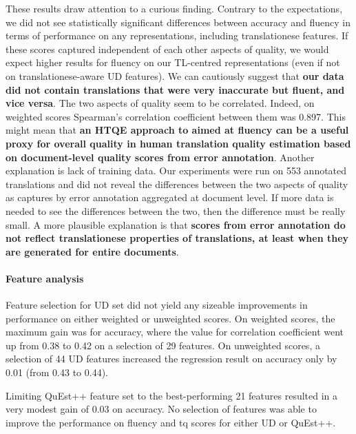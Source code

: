 These results draw attention to a curious finding. Contrary to the expectations, we did not see statistically significant differences between accuracy and fluency in terms of performance on any representations, including translationese features. If these scores captured independent of each other aspects of quality, we would expect higher results for fluency on our TL-centred representations (even if not on translationese-aware UD features). We can cautiously suggest that \textbf{our data did not contain translations that were very inaccurate but fluent, and vice versa}. The two aspects of quality seem to be correlated. Indeed, on weighted scores Spearman's correlation coefficient between them was 0.897. %
This might mean that \textbf{an \gls*{HTQE} approach to aimed at fluency can be a useful proxy for overall quality in human translation quality estimation based on document-level quality scores from error annotation}.
Another explanation is lack of training data. Our experiments were run on 553 annotated translations and did not reveal the differences between the two aspects of quality as captures by error annotation aggregated at document level. If more data is needed to see the differences between the two, then the difference must be really small. A more plausible explanation is that \textbf{scores from error annotation do not reflect translationese properties of translations, at least when they are generated for entire documents}. %

\paragraph{Feature analysis} 
Feature selection for UD set did not yield any sizeable improvements in performance on either weighted or unweighted scores. 
On weighted scores, the maximum gain was for accuracy, where the value for correlation coefficient went up from 0.38 to 0.42 on a selection of 29 features. On unweighted scores, a selection of 44 UD features increased the regression result on accuracy only by 0.01 (from 0.43 to 0.44). 

Limiting QuEst++ feature set to the best-performing 21 features resulted in a very modest gain of 0.03 on accuracy. %
No selection of features was able to improve the performance on fluency and tq scores for either UD or QuEst++. 

